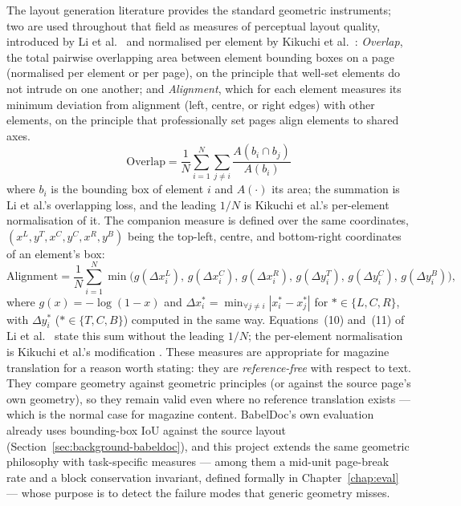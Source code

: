 The layout generation literature provides the standard geometric
instruments; two are used throughout that field as measures of
perceptual layout quality, introduced by Li et al.\
\cite{li2020layoutgan} and normalised per element by Kikuchi et
al.\ \cite{kikuchi2021layoutganpp}:
\emph{Overlap}, the total pairwise overlapping area between element
bounding boxes on a page (normalised per element or per page), on the
principle that well-set elements do not intrude on one another; and
\emph{Alignment}, which for each element measures its minimum deviation
from alignment (left, centre, or right edges) with other elements, on
the principle that professionally set pages align elements to shared
axes.
\begin{equation}
\mathrm{Overlap} = \frac{1}{N}\sum_{i=1}^{N}\sum_{j \ne i}
\frac{A\!\left(b_i \cap b_j\right)}{A\!\left(b_i\right)}
\label{eq:overlap}
\end{equation}
where $b_i$ is the bounding box of element $i$ and $A(\cdot)$ its
area; the summation is Li et al.'s overlapping loss, and the leading
$1/N$ is Kikuchi et al.'s per-element normalisation of it. The
companion measure is defined over the same coordinates,
$(x^{L}, y^{T}, x^{C}, y^{C}, x^{R}, y^{B})$ being the top-left,
centre, and bottom-right coordinates of an element's box:
\begin{equation}
\mathrm{Alignment} = \frac{1}{N}\sum_{i=1}^{N}
\min\!\Big(
g\!\left(\Delta x_i^{L}\right),\,
g\!\left(\Delta x_i^{C}\right),\,
g\!\left(\Delta x_i^{R}\right),\,
g\!\left(\Delta y_i^{T}\right),\,
g\!\left(\Delta y_i^{C}\right),\,
g\!\left(\Delta y_i^{B}\right)
\Big),
\label{eq:alignment}
\end{equation}
where $g(x) = -\log(1-x)$ and
$\Delta x_i^{*} = \min_{\forall j \ne i}\left| x_i^{*} - x_j^{*}\right|$
for $* \in \{L, C, R\}$, with $\Delta y_i^{*}$ ($* \in \{T, C, B\}$)
computed in the same way. Equations~(10) and~(11) of Li et al.\
\cite{li2020layoutgan} state this sum without the leading $1/N$; the
per-element normalisation is Kikuchi et al.'s modification
\cite{kikuchi2021layoutganpp}.
These measures are appropriate for magazine translation for a reason
worth stating: they are \emph{reference-free} with respect to text.
They compare geometry against geometric principles (or against the
source page's own geometry), so they remain valid even where no
reference translation exists --- which is the normal case for magazine
content. BabelDoc's own evaluation already uses bounding-box IoU
against the source layout \cite{qi2026babeldoc}
(Section~\ref{sec:background-babeldoc}), and this project extends the same
geometric philosophy with task-specific measures --- among them a
mid-unit page-break rate and a block conservation invariant, defined
formally in Chapter~\ref{chap:eval} --- whose purpose is to detect the
failure modes that generic geometry misses.

